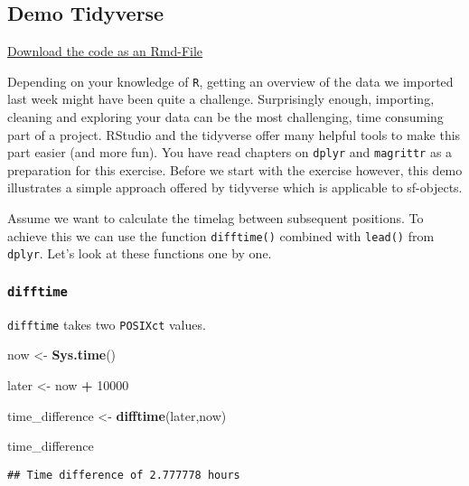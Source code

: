 \documentclass[
]{article}
\author{}
\date{\vspace{-2.5em}}
\newenvironment{Shaded}{\begin{snugshade}}{\end{snugshade}}
\newcommand{\DecValTok}[1]{\textcolor[rgb]{0.00,0.00,0.81}{#1}}
\newcommand{\KeywordTok}[1]{\textcolor[rgb]{0.13,0.29,0.53}{\textbf{#1}}}
\newcommand{\NormalTok}[1]{#1}
\newcommand{\OperatorTok}[1]{\textcolor[rgb]{0.81,0.36,0.00}{\textbf{#1}}}
\newcommand{\StringTok}[1]{\textcolor[rgb]{0.31,0.60,0.02}{#1}}
\begin{document}
\hypertarget{demo-tidyverse}{%
\subsection{Demo Tidyverse}\label{demo-tidyverse}}

\href{W2_4_demo_tidyverse.Rmd}{Download the code as an Rmd-File}

Depending on your knowledge of \texttt{R}, getting an overview of the
data we imported last week might have been quite a challenge.
Surprisingly enough, importing, cleaning and exploring your data can be
the most challenging, time consuming part of a project. RStudio and the
tidyverse offer many helpful tools to make this part easier (and more
fun). You have read chapters on \texttt{dplyr} and \texttt{magrittr} as
a preparation for this exercise. Before we start with the exercise
however, this demo illustrates a simple approach offered by tidyverse
which is applicable to sf-objects.

Assume we want to calculate the timelag between subsequent positions. To
achieve this we can use the function \texttt{difftime()} combined with
\texttt{lead()} from \texttt{dplyr}. Let's look at these functions one
by one.

\hypertarget{difftime}{%
\subsubsection{\texorpdfstring{\texttt{difftime}}{difftime}}\label{difftime}}

\texttt{difftime} takes two \texttt{POSIXct} values.

\begin{Shaded}
\begin{Highlighting}[]
\NormalTok{now <-}\StringTok{ }\KeywordTok{Sys.time}\NormalTok{()}

\NormalTok{later <-}\StringTok{ }\NormalTok{now }\OperatorTok{+}\StringTok{ }\DecValTok{10000}

\NormalTok{time_difference <-}\StringTok{ }\KeywordTok{difftime}\NormalTok{(later,now)}
\end{Highlighting}
\end{Shaded}

\begin{Shaded}
\begin{Highlighting}[]
\NormalTok{time_difference}
\end{Highlighting}
\end{Shaded}

\begin{verbatim}
## Time difference of 2.777778 hours
\end{verbatim}
\end{document}
